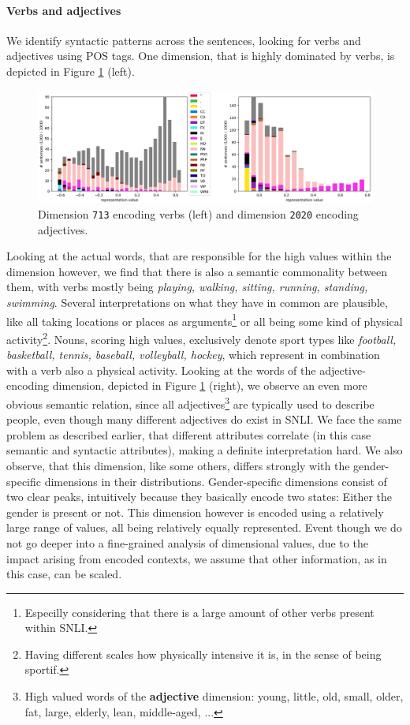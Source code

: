 \paragraph*{Verbs and adjectives}
We identify syntactic patterns across the sentences, looking for verbs and adjectives using \ac{POS} tags. One dimension, that is highly dominated by verbs, is depicted in Figure \ref{fig:find_syntax_vb} (left).
\begin{figure}[tph!]
\centering
	\includegraphics[totalheight=6cm]{fig/find_syntax_vb.png}
	\caption{Dimension \texttt{713} encoding verbs (left) and dimension \texttt{2020} encoding adjectives.}
	\label{fig:find_syntax_vb}
\end{figure}
Looking at the actual words, that are responsible for the high values within the dimension however, we find that there is also a semantic commonality between them, with verbs mostly being \textit{playing, walking, sitting, running, standing, swimming}. Several interpretations on what they have in common are plausible, like all taking locations or places as arguments\footnote{Especilly considering that there is a large amount of other verbs present within \ac{SNLI}.} or all being some kind of physical activity\footnote{Having different scales how physically intensive it is, in the sense of being sportif.}. Nouns, scoring high values, exclusively denote sport types like \textit{football, basketball, tennis, baseball, volleyball, hockey}, which represent in combination with a verb also a physical activity. Looking at the words of the adjective-encoding dimension, depicted in Figure \ref{fig:find_syntax_vb} (right), we observe an even more obvious semantic relation, since all adjectives\footnote{High valued words of the \textbf{adjective} dimension: young, little, old, small, older, fat, large, elderly, lean, middle-aged, ...} are typically used to describe people, even though many different adjectives do exist in \ac{SNLI}. We face the same problem as described earlier, that different attributes correlate (in this case semantic and syntactic attributes), making a definite interpretation hard. We also observe, that this dimension, like some others, differs strongly with the gender-specific dimensions in their distributions. Gender-specific dimensions consist of two clear peaks, intuitively because they basically encode two states: Either the gender is present or not. This dimension however is encoded using a relatively large range of values, all being relatively equally represented. Event though we do not go deeper into a fine-grained analysis of dimensional values, due to the impact arising from encoded contexts, we assume that other information, as in this case, can be scaled. 

